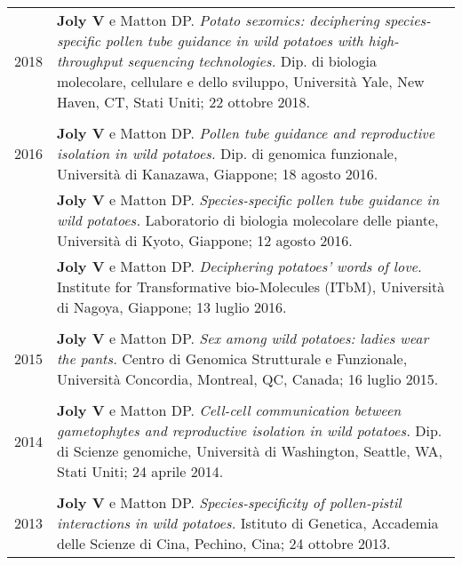 \documentclass[letterpaper,12pt]{article}
\begin{document}
\begin{tabularx}{\textwidth}{@{}r|X@{}}

2018
& \textbf{Joly V} e Matton DP.
  \emph{Potato sexomics: deciphering species-specific pollen tube guidance in
  wild potatoes with high-throughput sequencing technologies.}
  Dip. di biologia molecolare, cellulare e dello sviluppo,
  Università Yale, New Haven, CT, Stati Uniti;
  22 ottobre 2018.
  \\

\multicolumn{2}{c}{} \\

2016
& \textbf{Joly V} e Matton DP.
  \emph{Pollen tube guidance and reproductive isolation in wild potatoes.}
  Dip. di genomica funzionale,
  Università di Kanazawa, Giappone;
  18 agosto 2016.
  \vspace{1.5mm}
  \\

& \textbf{Joly V} e Matton DP.
  \emph{Species-specific pollen tube guidance in wild potatoes.}
  Laboratorio di biologia molecolare delle piante,
  Università di Kyoto, Giappone;
  12 agosto 2016.
  \vspace{1.5mm}
  \\

& \textbf{Joly V} e Matton DP.
  \emph{Deciphering potatoes’ words of love.}
  Institute for Transformative bio-Molecules (ITbM),
  Università di Nagoya, Giappone;
  13 luglio 2016.
  \\

\multicolumn{2}{c}{} \\

2015
& \textbf{Joly V} e Matton DP.
  \emph{Sex among wild potatoes: ladies wear the pants.}
  Centro di Genomica Strutturale e Funzionale,
  Università Concordia, Montreal, QC, Canada;
  16 luglio 2015.
  \\

\multicolumn{2}{c}{} \\

2014
& \textbf{Joly V} e Matton DP.
  \emph{Cell-cell communication between gametophytes and reproductive isolation
  in wild potatoes.}
  Dip. di Scienze genomiche, Università di Washington, Seattle, WA, Stati Uniti;
  24 aprile 2014.
  \\

\multicolumn{2}{c}{} \\

2013
& \textbf{Joly V} e Matton DP.
  \emph{Species-specificity of pollen-pistil interactions in wild potatoes.}
  Istituto di Genetica, Accademia delle Scienze di Cina, Pechino, Cina;
  24 ottobre 2013.
  \\

\end{tabularx}
\end{document}
